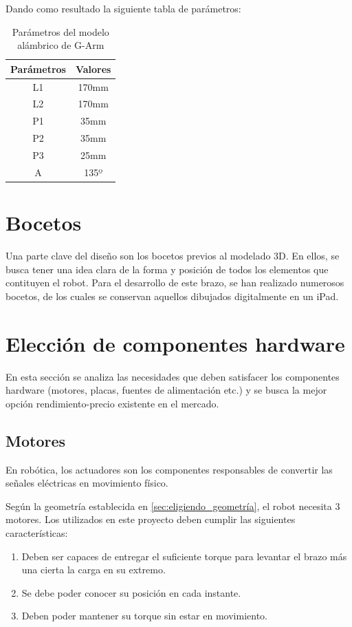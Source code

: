 Dando como resultado la siguiente tabla de parámetros:
\begin{table}[H]
\begin{center}
\begin{tabular}{|c|c|}
\hline
\textbf{Parámetros} & \textbf{Valores} \\
\hline
L1 & 170mm \\
L2 & 170mm \\
P1 & 35mm \\
P2 & 35mm \\
P3 & 25mm \\
A & 135º \\
\hline
\end{tabular}
\caption{Parámetros del modelo alámbrico de G-Arm}
\label{cuadro:parametros_alambrico}
\end{center}
\end{table}
\newpage
\section{Bocetos}
Una parte clave del diseño son los bocetos previos al modelado 3D. En ellos, se busca tener una idea clara de la forma 
y posición de todos los elementos que contituyen el robot.  
Para el desarrollo de este brazo, se han realizado numerosos bocetos, de los cuales se conservan aquellos dibujados digitalmente en 
un iPad.
\section{Elección de componentes hardware}
En esta sección se analiza las necesidades que deben satisfacer los componentes hardware (motores, placas, fuentes de alimentación etc.)
y se busca la mejor opción rendimiento-precio existente en el mercado. 

\subsection{Motores}
En robótica, los actuadores son los componentes responsables de convertir las señales eléctricas 
en movimiento físico.

Según la geometría establecida en \ref{sec:eligiendo_geometría}, el robot necesita 3 motores. Los utilizados en este proyecto deben
cumplir las siguientes características:
\begin{enumerate}
  \item Deben ser capaces de entregar el suficiente torque para levantar el brazo más una cierta la carga en su extremo.
  \item Se debe poder conocer su posición en cada instante.
  \item Deben poder mantener su torque sin estar en movimiento.
\end{enumerate}

